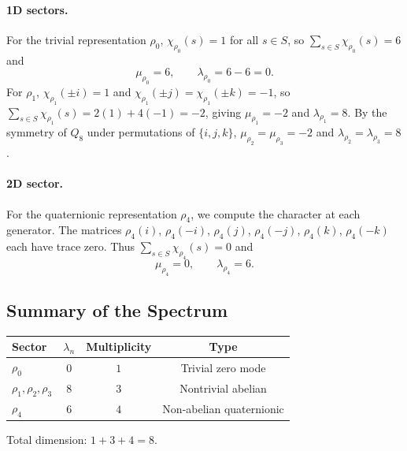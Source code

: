 \documentclass[11pt,a4paper]{article}
\begin{document}
  \paragraph{1D sectors.}
    For the trivial representation $\rho_0$, $\chi_{\rho_0}(s) = 1$ for all
    $s \in S$, so $\sum_{s \in S} \chi_{\rho_0}(s) = 6$ and
    \begin{equation}
      \mu_{\rho_0} = 6,
      \qquad
      \lambda_{\rho_0} = 6 - 6 = 0.
    \end{equation}
    For $\rho_1$, $\chi_{\rho_1}(\pm i) = 1$ and
    $\chi_{\rho_1}(\pm j) = \chi_{\rho_1}(\pm k) = -1$,
    so $\sum_{s \in S} \chi_{\rho_1}(s) = 2(1) + 4(-1) = -2$, giving
    $\mu_{\rho_1} = -2$ and $\lambda_{\rho_1} = 8$.
    By the symmetry of $Q_8$ under permutations of $\{i,j,k\}$,
    $\mu_{\rho_2} = \mu_{\rho_3} = -2$ and
    $\lambda_{\rho_2} = \lambda_{\rho_3} = 8$.

  \paragraph{2D sector.}
    For the quaternionic representation $\rho_4$, we compute the character at each
    generator.
    The matrices $\rho_4(i)$, $\rho_4(-i)$, $\rho_4(j)$, $\rho_4(-j)$,
    $\rho_4(k)$, $\rho_4(-k)$ each have trace zero.
    Thus $\sum_{s \in S} \chi_{\rho_4}(s) = 0$ and
    \begin{equation}
      \mu_{\rho_4} = 0,
      \qquad
      \lambda_{\rho_4} = 6.
    \end{equation}
\subsection{Summary of the Spectrum}
  \label{subsec:summary-of-spectrum}

  \begin{center}
    \begin{tabular}{lccc}
      \hline
      Sector                   & $\lambda_n$ & Multiplicity & Type                     \\
      \hline
      $\rho_0$                 & $0$         & $1$          & Trivial zero mode        \\
      $\rho_1, \rho_2, \rho_3$ & $8$         & $3$          & Nontrivial abelian       \\
      $\rho_4$                 & $6$         & $4$          & Non-abelian quaternionic \\
      \hline
    \end{tabular}
  \end{center}
  Total dimension: $1 + 3 + 4 = 8$.
\end{document}
